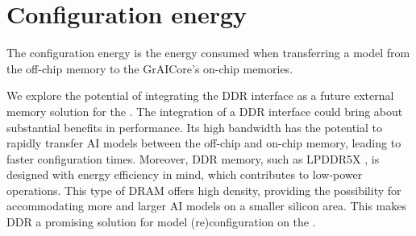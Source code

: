 \section{Configuration energy}
\label{section:configuration_energy}
The configuration energy is the energy consumed when transferring a model from the off-chip memory to the GrAICore's on-chip memories.

We explore the potential of integrating the DDR interface as a future external memory solution for the \graicore{}.
The integration of a DDR interface could bring about substantial benefits in performance.
Its high bandwidth has the potential to rapidly transfer AI models between the off-chip and on-chip memory, leading to faster configuration times.
Moreover, DDR memory, such as LPDDR5X \cite{JEDEC_JESD209-5C}, is designed with energy efficiency in mind, which contributes to low-power operations.
This type of DRAM offers high density, providing the possibility for accommodating more and larger AI models on a smaller silicon area.
This makes DDR a promising solution for model (re)configuration on the \graicore{}.


